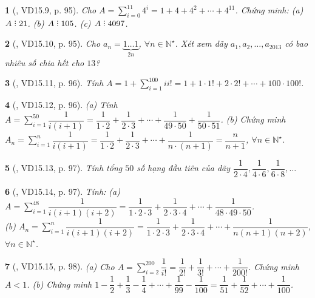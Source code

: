 \documentclass{article}
\newtheorem{baitoan}{}
\DeclareRobustCommand{\divby}{%
	\mathrel{\vbox{\baselineskip.65ex\lineskiplimit0pt\hbox{.}\hbox{.}\hbox{.}}}%
}
\begin{document}
\begin{baitoan}[\cite{TLCT_THCS_Toan_6_so_hoc}, VD15.9, p. 95]
	Cho $A = \sum_{i=0}^{11} 4^i = 1 + 4 + 4^2 + \cdots + 4^{11}$. Chứng minh: (a) $A\divby21$. (b) $A\divby105$. (c) $A\divby4097$.
\end{baitoan}

\begin{baitoan}[\cite{TLCT_THCS_Toan_6_so_hoc}, VD15.10, p. 95]
	Cho $a_n = \underbrace{1\ldots1}_{2n}$, $\forall n\in\mathbb{N}^\star$. Xét xem dãy $a_1,a_2,\ldots,a_{2013}$ có bao nhiêu số chia hết cho $13$?
\end{baitoan}

\begin{baitoan}[\cite{TLCT_THCS_Toan_6_so_hoc}, VD15.11, p. 96]
	Tính $A = 1 + \sum_{i=1}^{100} ii!  = 1 + 1\cdot1! + 2\cdot2! + \cdots + 100\cdot100!$.
\end{baitoan}

\begin{baitoan}[\cite{TLCT_THCS_Toan_6_so_hoc}, VD15.12, p. 96]
	(a) Tính $A = \sum_{i=1}^{50} \dfrac{1}{i(i + 1)} = \dfrac{1}{1\cdot2} + \dfrac{1}{2\cdot3} + \cdots + \dfrac{1}{49\cdot50} + \dfrac{1}{50\cdot51}$. (b) Chứng minh $A_n = \sum_{i=1}^n \dfrac{1}{i(i + 1)} = \dfrac{1}{1\cdot2} + \dfrac{1}{2\cdot3} + \cdots + \dfrac{1}{n\cdot(n + 1)} = \dfrac{n}{n + 1}$, $\forall n\in\mathbb{N}^\star$.
\end{baitoan}

\begin{baitoan}[\cite{TLCT_THCS_Toan_6_so_hoc}, VD15.13, p. 97]
	Tính tổng $50$ số hạng đầu tiên của dãy $\dfrac{1}{2\cdot4},\dfrac{1}{4\cdot6},\dfrac{1}{6\cdot8},\ldots$
\end{baitoan}

\begin{baitoan}[\cite{TLCT_THCS_Toan_6_so_hoc}, VD15.14, p. 97]
	Tính: (a) $A = \sum_{i=1}^{48} \dfrac{1}{i(i + 1)(i + 2)} = \dfrac{1}{1\cdot2\cdot3} + \dfrac{1}{2\cdot3\cdot4} + \cdots + \dfrac{1}{48\cdot49\cdot50}$.\\(b) $A_n = \sum_{i=1}^n \dfrac{1}{i(i + 1)(i + 2)} = \dfrac{1}{1\cdot2\cdot3} + \dfrac{1}{2\cdot3\cdot4} + \cdots + \dfrac{1}{n(n + 1)(n + 2)}$, $\forall n\in\mathbb{N}^\star$.
\end{baitoan}

\begin{baitoan}[\cite{TLCT_THCS_Toan_6_so_hoc}, VD15.15, p. 98]
	(a) Cho $A = \sum_{i=2}^{200} \dfrac{1}{i!} = \dfrac{1}{2!} + \dfrac{1}{3!} + \cdots + \dfrac{1}{200!}$. Chứng minh $A < 1$. (b) Chứng minh $1 - \dfrac{1}{2} + \dfrac{1}{3} - \dfrac{1}{4} + \cdots + \dfrac{1}{99} - \dfrac{1}{100} = \dfrac{1}{51} + \dfrac{1}{52} + \cdots + \dfrac{1}{100}$.
\end{baitoan}
\end{document}
